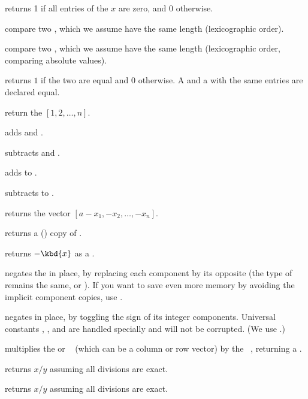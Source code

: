  returns 1 if all entries of the  $x$ are
zero, and $0$ otherwise.

 compare two , which we assume have
the same length (lexicographic order).

 compare two , which we assume have
the same length (lexicographic order, comparing absolute values).

 returns $1$ if the two  are equal
and $0$ otherwise. A  and a  with the same entries are
declared equal.

 return the  $[1, 2, \dots, n]$.

 adds  and .

 subtracts  and .

 adds  to .

 subtracts  to .

 returns the vector $[a - x_1,
-x_2,\dots,-x_n]$.

 returns a () copy of .

 returns $-\kbd{x}$ as a .

 negates the   in place, by
replacing each component by its opposite (the type of  remains the
same,  or ). If you want to save even more memory by
avoiding the implicit component copies, use .

 negates  in place, by toggling the
sign of its integer components. Universal constants ,
,  and  are handled specially and will
not be corrupted. (We use .)

 multiplies the  or ~
(which can be a column or row vector) by the ~, returning a
.

 returns $x/y$ assuming all divisions
are exact.

 returns $x/y$ assuming all divisions
are exact.

